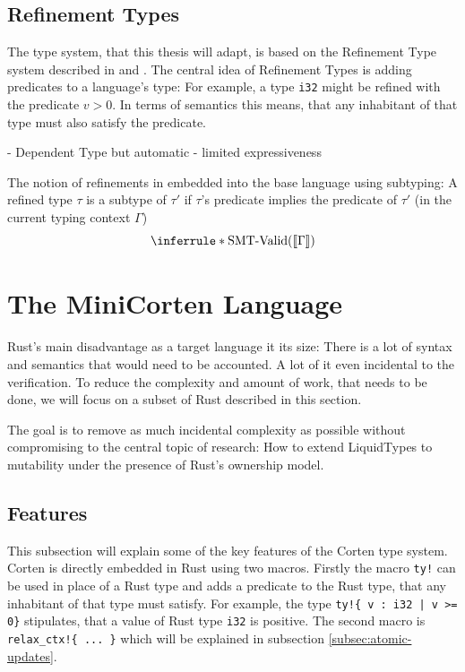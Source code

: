 \documentclass{book}
\newcommand{\code}[1]{\texttt{#1}}
\theoremstyle{definition}
\begin{document}
\section{Refinement Types}

The type system, that this thesis will adapt, is based on the Refinement Type system described in \cite{vazou_abstract_2013} and \cite{rondon_liquid_2008}. 
The central idea of Refinement Types is adding predicates to a language's type: For example, a type \code{i32} might be refined with the predicate $v > 0$. In terms of semantics this means, that any inhabitant of that type must also satisfy the predicate. 

- Dependent Type but automatic
- limited expressiveness

The notion of refinements in embedded into the base language using subtyping: A refined type $\tau$ is a subtype of $\tau'$ if $\tau$'s predicate implies the predicate of $\tau'$ (in the current typing context $\Gamma$)
\begin{equation*}
  \inferrule*
    {\text{SMT-Valid}(\llbracket \Gamma \rrbracket)}
    {}
\end{equation*}


\chapter{The MiniCorten Language}

Rust's main disadvantage as a target language it its size: There is a lot of syntax and semantics that would need to be accounted. A lot of it even incidental to the verification. To reduce the complexity and amount of work, that needs to be done, we will focus on a subset of Rust described in this section.

The goal is to remove as much incidental complexity as possible without compromising to the central topic of research: How to extend LiquidTypes to mutability under the presence of Rust's ownership model.

\section{Features}

This subsection will explain some of the key features of the Corten type system.
Corten is directly embedded in Rust using two macros. Firstly the macro \code{ty!} can be used in place of a Rust type and adds a predicate to the Rust type, that any inhabitant of that type must satisfy. For example, the type \code{ty!\{ v : i32 | v >= 0\}} stipulates, that a value of Rust type \code{i32} is positive. The second macro is \code{relax\_ctx!\{ ... \}} which will be explained in subsection \ref{subsec:atomic-updates}.
\end{document}
